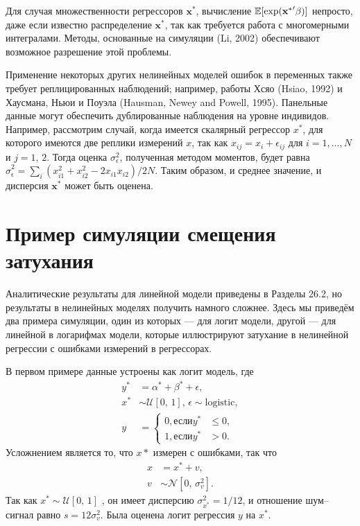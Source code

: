Для случая множественности регрессоров $\mathbf{x^*}$, вычисление $\mathbb{E} [\exp (\mathbf{x^*}' \mathbf{\beta})]$ непросто, даже если известно распределение $\mathbf{x^*}$, так как требуется работа с многомерными интегралами. Методы, основанные на симуляции (Li, 2002) обеспечивают возможное разрешение этой проблемы.

Применение некоторых других нелинейных моделей ошибок в переменных также требует реплицированных наблюдений; например, работы Хсяо (Hsiao, 1992) и Хаусмана, Ньюи и Поуэла (Hausman, Newey and Powell, 1995). Панельные данные могут обеспечить дублированные наблюдения на уровне индивидов. Например, рассмотрим случай, когда имеется скалярный регрессор $x^*$, для которого имеются две реплики измерений $x$, так как $x_{ij} = x_i + \epsilon_{ij}$ для $i=1,\dots,N$ и $j=1, \, 2$. Тогда оценка $\sigma^2_{\epsilon}$, полученная методом моментов, будет равна $\widehat{\sigma}^2_{\epsilon} = \sum \limits_i (x^2_{i1}+x^2_{i2} - 2x_{i1}x_{i2})/2N$. Таким образом, и среднее значение, и дисперсия $\mathbf{x^*}$ может быть оценена.
 
\section{Пример симуляции смещения затухания} 
Аналитические результаты для линейной модели приведены в Разделы 26.2, но результаты в нелинейных моделях получить намного сложнее. Здесь мы приведём два примера симуляции, один из которых --- для логит модели, другой --- для линейной в логарифмах модели, которые иллюстрируют затухание в нелинейной регрессии с ошибками измерений в регрессорах.

В первом примере данные устроены как логит модель, где
\begin{align*}
y^* &=\alpha^* + \beta^* + \epsilon, \\
x^* &\sim \mathcal{U}[0, \, 1], \, \epsilon \sim \text{logistic}, \\
y &= 
\begin{cases}
0, \text{если} y^* &\leqslant0 ,\\
1, \text{если} y^* &>0.
\end{cases}
\end{align*}
Усложнением является то, что $x*$ измерен с ошибками, так что
\begin{align*}
x &=x^*+v, \\
v &\sim \mathcal{N}[0, \, \sigma^2_v].
\end{align*}
Так как $x^* \sim \mathcal{U}[0, \, 1]$ , он имеет дисперсию $\sigma^2_{x^*}=1/12$, и отношение шум--сигнал равно $s=12\sigma^2_v$. Была оценена логит регрессия $y$ на $x^*$.

